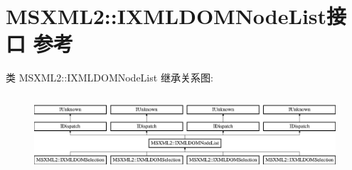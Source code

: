 \hypertarget{interface_m_s_x_m_l2_1_1_i_x_m_l_d_o_m_node_list}{}\section{M\+S\+X\+M\+L2\+:\+:I\+X\+M\+L\+D\+O\+M\+Node\+List接口 参考}
\label{interface_m_s_x_m_l2_1_1_i_x_m_l_d_o_m_node_list}
类 M\+S\+X\+M\+L2\+:\+:I\+X\+M\+L\+D\+O\+M\+Node\+List 继承关系图\+:\begin{figure}[H]
\begin{center}
\leavevmode
\includegraphics[height=2.931937cm]{interface_m_s_x_m_l2_1_1_i_x_m_l_d_o_m_node_list}
\end{center}
\end{figure}
